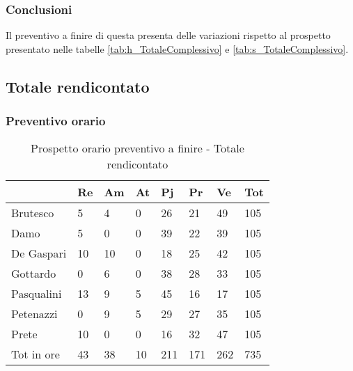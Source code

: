 		\subsubsection{Conclusioni} Il preventivo a finire di questa  presenta delle variazioni rispetto al prospetto presentato nelle tabelle \ref{tab:h_TotaleComplessivo} e \ref{tab:s_TotaleComplessivo}.
	\newpage
	\subsection{Totale rendicontato}
		\subsubsection{Preventivo orario}
			\begin{table}[H] \begin{center} \begin{tabular}{llllllll}
									\toprule
										&	\textbf{Re}	&	\textbf{Am}	&	\textbf{At}	&	\textbf{Pj}	&	\textbf{Pr}	&	\textbf{Ve}	&	\textbf{Tot}	 \\
									\midrule
									Brutesco	&	5	&	4	&	0	&	26	&	21	&	49	&	105	 \\
									Damo	&	5	&	0	&	0	&	39	&	22	&	39	&	105	 \\
									De Gaspari	&	10	&	10	&	0	&	18	&	25	&	42	&	105	 \\
									Gottardo	&	0	&	6	&	0	&	38	&	28	&	33	&	105	 \\
									Pasqualini	&	13	&	9	&	5	&	45	&	16	&	17	&	105	 \\
									Petenazzi	&	0	&	9	&	5	&	29	&	27	&	35	&	105	 \\
									Prete	&	10	&	0	&	0	&	16	&	32	&	47	&	105	 \\
									\midrule
									Tot in ore	&	43	&	38	&	10	&	211	&	171	&	262	&	735	 \\

									\bottomrule
									\end{tabular} \end{center} \caption{Prospetto orario preventivo a finire -
									Totale rendicontato
									}\end{table}
